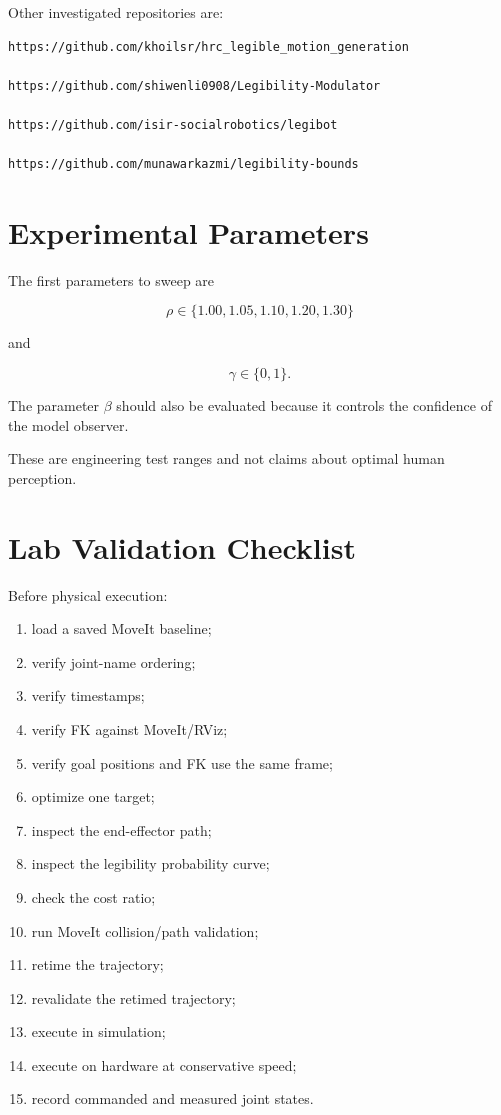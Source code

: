 \documentclass[11pt]{article}
\begin{document}
Other investigated repositories are:

\begin{verbatim}
https://github.com/khoilsr/hrc_legible_motion_generation

https://github.com/shiwenli0908/Legibility-Modulator

https://github.com/isir-socialrobotics/legibot

https://github.com/munawarkazmi/legibility-bounds
\end{verbatim}

\section{Experimental Parameters}

The first parameters to sweep are

\[
\rho
\in
\{1.00,1.05,1.10,1.20,1.30\}
\]

and

\[
\gamma
\in
\{0,1\}.
\]

The parameter $\beta$ should also be evaluated because it
controls the confidence of the model observer.

These are engineering test ranges and not claims about optimal
human perception.

\section{Lab Validation Checklist}

Before physical execution:

\begin{enumerate}

    \item load a saved MoveIt baseline;
    \item verify joint-name ordering;
    \item verify timestamps;
    \item verify FK against MoveIt/RViz;
    \item verify goal positions and FK use the same frame;
    \item optimize one target;
    \item inspect the end-effector path;
    \item inspect the legibility probability curve;
    \item check the cost ratio;
    \item run MoveIt collision/path validation;
    \item retime the trajectory;
    \item revalidate the retimed trajectory;
    \item execute in simulation;
    \item execute on hardware at conservative speed;
    \item record commanded and measured joint states.
\end{enumerate}
\end{document}
